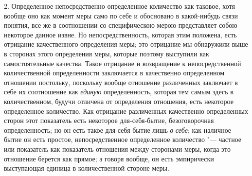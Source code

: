 2. Определенное непосредственно определенное количество как таковое, хотя
вообще оно как момент меры само по себе и обосновано в какой-нибудь связи
понятия, все же в соотношении со специфическою мерою представляет собою
некоторое данное извне. Но непосредственность, которая этим положена, есть
отрицание качественного определения меры; это отрицание мы обнаружили выше
в сторонах этого определения меры, которые поэтому выступили как
самостоятельные качества. Такое отрицание и возвращение к непосредственной
количественной определенности заключается в качественно определенном
отношении постольку, поскольку вообще отношение различенных заключает в
себе их соотношение как {\em единую} определенность,
которая тем самым здесь в количественном, будучи отличена от определения
отношения, есть некоторое определенное количество. Как отрицание
различенных качественно определенных сторон этот показатель есть некоторое
для-себя-бытие, безоговорочная определенность; но он есть такое
для-себя-бытие лишь {\em в себе}; как наличное бытие он
есть простое, непосредственное определенное количество "--- частное или
показатель как показатель отношения между сторонами меры, когда это
отношение берется как прямое; а говоря вообще, он есть эмпирически
выступающая единица в количественной стороне меры.
